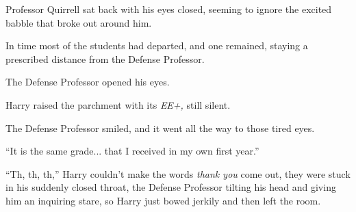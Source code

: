 Professor Quirrell sat back with his eyes closed, seeming to ignore the excited babble that broke out around him.

In time most of the students had departed, and one remained, staying a prescribed distance from the Defense Professor.

The Defense Professor opened his eyes.

Harry raised the parchment with its \emph{EE+,} still silent.

The Defense Professor smiled, and it went all the way to those tired eyes.

``It is the same grade... that I received in my own first year.''

``Th, th, th,'' Harry couldn't make the words \emph{thank you} come out, they were stuck in his suddenly closed throat, the Defense Professor tilting his head and giving him an inquiring stare, so Harry just bowed jerkily and then left the room.
